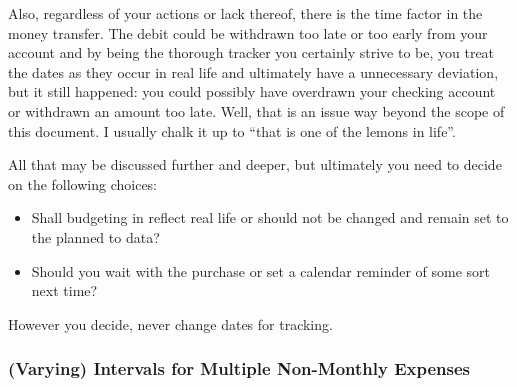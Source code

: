 Also, regardless of your actions or lack thereof, there is the time factor in the money transfer.
The debit could be withdrawn too late or too early from your account and by being the thorough tracker you certainly strive to be, you treat the dates as they occur in real life and ultimately have a unnecessary deviation, but it still happened: you could possibly have overdrawn your checking account or withdrawn an amount too late.
Well, that is an issue way beyond the scope of this document.
I usually chalk it up to ``that is one of the lemons in life''.

All that may be discussed further and deeper, but ultimately you need to decide on the following choices:
\begin{itemize}
	\item Shall budgeting in \tfn reflect real life or should \tfn not be changed and remain set to the planned to data?
	\item Should you wait with the purchase or set a calendar reminder of some sort next time?
\end{itemize}
\begin{specialnote}
	However you decide, never change dates for tracking.
\end{specialnote}

\subsubsection{(Varying) Intervals for Multiple Non-Monthly Expenses}
\label{subsubsec:multiple-non-monthly-expenses}

